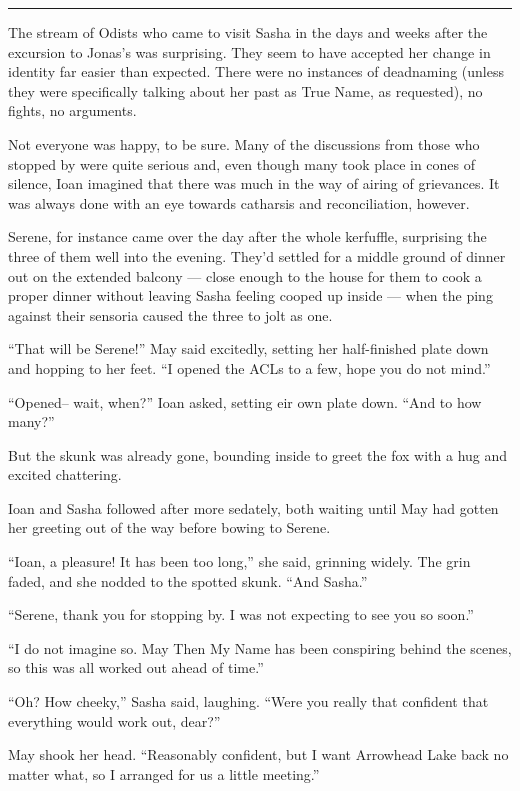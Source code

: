 \begin{center}\rule{0.5\linewidth}{0.5pt}\end{center}

The stream of Odists who came to visit Sasha in the days and weeks after the excursion to Jonas's was surprising. They seem to have accepted her change in identity far easier than expected. There were no instances of deadnaming (unless they were specifically talking about her past as True Name, as requested), no fights, no arguments.

Not everyone was happy, to be sure. Many of the discussions from those who stopped by were quite serious and, even though many took place in cones of silence, Ioan imagined that there was much in the way of airing of grievances. It was always done with an eye towards catharsis and reconciliation, however.

Serene, for instance came over the day after the whole kerfuffle, surprising the three of them well into the evening. They'd settled for a middle ground of dinner out on the extended balcony — close enough to the house for them to cook a proper dinner without leaving Sasha feeling cooped up inside — when the ping against their sensoria caused the three to jolt as one.

``That will be Serene!'' May said excitedly, setting her half-finished plate down and hopping to her feet. ``I opened the ACLs to a few, hope you do not mind.''

``Opened-- wait, when?'' Ioan asked, setting eir own plate down. ``And to how many?''

But the skunk was already gone, bounding inside to greet the fox with a hug and excited chattering.

Ioan and Sasha followed after more sedately, both waiting until May had gotten her greeting out of the way before bowing to Serene.

``Ioan, a pleasure! It has been too long,'' she said, grinning widely. The grin faded, and she nodded to the spotted skunk. ``And Sasha.''

``Serene, thank you for stopping by. I was not expecting to see you so soon.''

``I do not imagine so. May Then My Name has been conspiring behind the scenes, so this was all worked out ahead of time.''

``Oh? How cheeky,'' Sasha said, laughing. ``Were you really that confident that everything would work out, dear?''

May shook her head. ``Reasonably confident, but I want Arrowhead Lake back no matter what, so I arranged for us a little meeting.''

